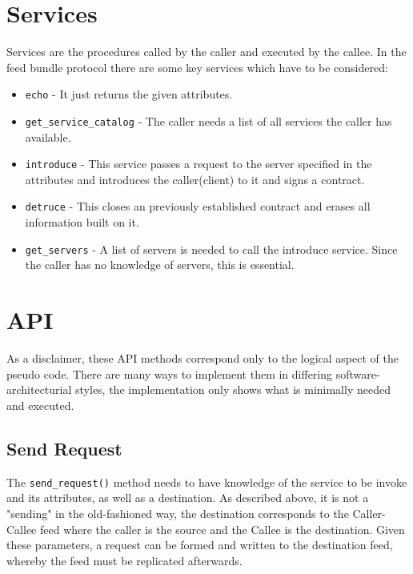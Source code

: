 \section{Services}
Services are the procedures called by the caller and executed by the callee. In the feed bundle protocol there are some key services which have to be considered:
\begin{itemize}
    \item \lstinline{echo} - It just returns the given attributes.
    \item \lstinline{get_service_catalog} - The caller needs a list of all services the caller has available.
    \item \lstinline{introduce} - This service passes a request to the server specified in the attributes and introduces the caller(client) to it and signs a contract.
    \item \lstinline{detruce} - This closes an previously established contract and erases all information built on it.
    \item \lstinline{get_servers} - A list of servers is needed to call the introduce service. Since the caller has no knowledge of servers, this is essential.
\end{itemize}
\section{API}
As a disclaimer, these API methods correspond only to the logical aspect of the pseudo code. There are many ways to implement them in differing software-architecturial styles, the implementation only shows what is minimally needed and executed.
\subsection{Send Request}
The \lstinline{send_request()} method needs to have knowledge of the service to be invoke and its attributes, as well as a destination. As described above, it is not a "sending" in the old-fashioned way, the destination corresponds to the Caller-Callee feed where the caller is the source and the Callee is the destination. Given these parameters, a request can be formed and written to the destination feed, whereby the feed must be replicated afterwards.
\begin{python}
    
    
\end{python}

 
